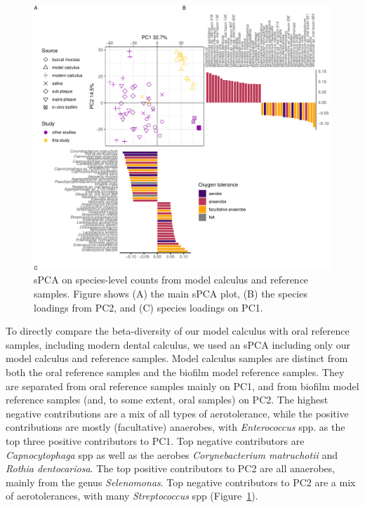 \documentclass[
  b5paper,
]{book}
\begin{document}
\begin{figure}

{\centering \includegraphics{figures/byoc-valid-fig-spca-compar-1.pdf}

}

\caption{\label{fig-spca-compar}sPCA on species-level counts from model
calculus and reference samples. Figure shows (A) the main sPCA plot, (B)
the species loadings from PC2, and (C) species loadings on PC1.}

\end{figure}

To directly compare the beta-diversity of our model calculus with oral
reference samples, including modern dental calculus, we used an sPCA
including only our model calculus and reference samples. Model calculus
samples are distinct from both the oral reference samples and the
biofilm model reference samples. They are separated from oral reference
samples mainly on PC1, and from biofilm model reference samples (and, to
some extent, oral samples) on PC2. The highest negative contributions
are a mix of all types of aerotolerance, while the positive
contributions are mostly (facultative) anaerobes, with
\emph{Enterococcus} spp. as the top three positive contributors to PC1.
Top negative contributors are \emph{Capnocytophaga} spp as well as the
aerobes \emph{Corynebacterium matruchotii} and \emph{Rothia
dentocariosa}. The top positive contributors to PC2 are all anaerobes,
mainly from the genus \emph{Selenomonas}. Top negative contributors to
PC2 are a mix of aerotolerances, with many \emph{Streptococcus} spp
(Figure~\ref{fig-spca-compar}).
\end{document}
